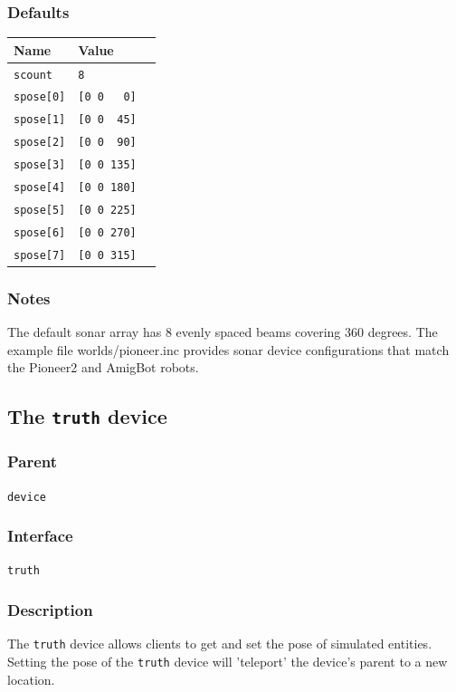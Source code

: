 \documentclass[11pt,twoside]{report}
\begin{document}
\subsubsection*{Defaults}
\begin{tabularx}{\columnwidth}{llX}
\hline
Name & Value\\
\hline
\verb'scount' & \verb'8'\\
\verb'spose[0]' & \verb'[0 0   0]'\\
\verb'spose[1]' & \verb'[0 0  45]'\\
\verb'spose[2]' & \verb'[0 0  90]'\\
\verb'spose[3]' & \verb'[0 0 135]'\\
\verb'spose[4]' & \verb'[0 0 180]'\\
\verb'spose[5]' & \verb'[0 0 225]'\\
\verb'spose[6]' & \verb'[0 0 270]'\\
\verb'spose[7]' & \verb'[0 0 315]'\\
\hline
\end{tabularx}

\subsubsection*{Notes}
The default sonar array has 8 evenly spaced beams covering 360
degrees. The example file worlds/pioneer.inc provides sonar device
configurations that match the Pioneer2 and AmigBot robots.

\newpage
\subsection{The {\tt truth} device}

\subsubsection*{Parent}
{\tt device}

\subsubsection*{Interface}
{\tt truth}

\subsubsection*{Description}
The {\tt truth} device allows clients to get and set the pose of
simulated entities.  Setting the pose of the {\tt truth} device will
'teleport' the device's parent to a new location.
\end{document}

